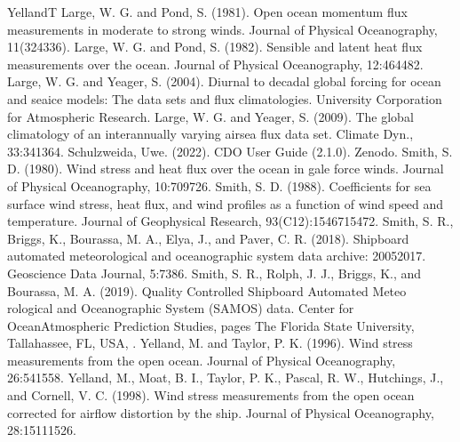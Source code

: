 \documentclass[letterpaper,10pt,english]{sphinxmanual}
\begin{document}
\begin{sphinxthebibliography}{YellandT}
\sphinxAtStartPar
Large, W. G. and Pond, S. (1981). Open ocean momentum flux measurements in moderate to strong winds. Journal of Physical Oceanography, 11(324\textendash{}336).
\sphinxAtStartPar
Large, W. G. and Pond, S. (1982). Sensible and latent heat flux measurements over the ocean. Journal of Physical Oceanography, 12:464\textendash{}482.
\sphinxAtStartPar
Large, W. G. and Yeager, S. (2004). Diurnal to decadal global forcing for ocean and sea\sphinxhyphen{}ice models: The data sets and flux climatologies. University Corporation for Atmospheric Research.
\sphinxAtStartPar
Large, W. G. and Yeager, S. (2009). The global climatology of an interannually varying air\textendash{}sea flux data set. Climate Dyn., 33:341\textendash{}364.
\sphinxAtStartPar
Schulzweida, Uwe. (2022). CDO User Guide (2.1.0). Zenodo. 
\sphinxAtStartPar
Smith, S. D. (1980). Wind stress and heat flux over the ocean in gale force winds. Journal of Physical Oceanography, 10:709\textendash{}726.
\sphinxAtStartPar
Smith, S. D. (1988). Coefficients for sea surface wind stress, heat flux, and wind profiles as a function of wind speed and temperature. Journal of Geophysical Research, 93(C12):15467\textendash{}15472.
\sphinxAtStartPar
Smith, S. R., Briggs, K., Bourassa, M. A., Elya, J., and Paver, C. R. (2018). Shipboard automated meteorological and oceanographic system data archive: 2005\textendash{}2017. Geoscience Data Journal, 5:73\textendash{}86.
\sphinxAtStartPar
Smith, S. R., Rolph, J. J., Briggs, K., and Bourassa, M. A. (2019). Quality Controlled Shipboard Automated Meteo\sphinxhyphen{} rological and Oceanographic System (SAMOS) data. Center for Ocean\sphinxhyphen{}Atmospheric Prediction Studies, pages The Florida State University, Tallahassee, FL, USA, .
\sphinxAtStartPar
Yelland, M. and Taylor, P. K. (1996). Wind stress measurements from the open ocean. Journal of Physical Oceanography, 26:541\textendash{}558.
\sphinxAtStartPar
Yelland, M., Moat, B. I., Taylor, P. K., Pascal, R. W., Hutchings, J., and Cornell, V. C. (1998). Wind stress measurements from the open ocean corrected for airflow distortion by the ship. Journal of Physical Oceanography, 28:1511\textendash{}1526.

\end{sphinxthebibliography}
\end{document}
